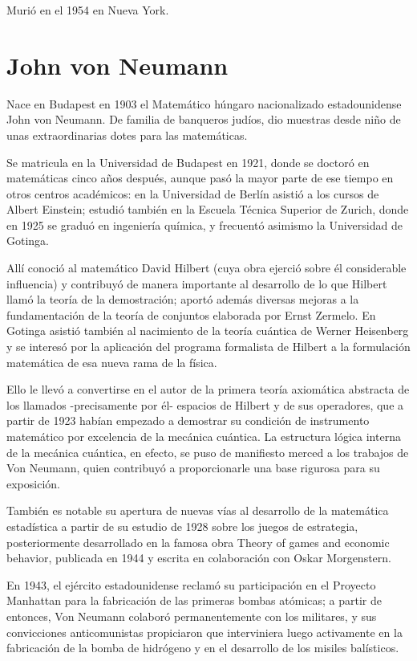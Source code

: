 \documentclass[letterpaper, 11pt]{article}
\begin{document}
\noindent Murió en el 1954 en Nueva York.

\newpage
\section*{John von Neumann}

Nace en Budapest en 1903 el Matemático húngaro nacionalizado estadounidense John von Neumann. De familia de banqueros judíos, dio muestras desde niño de unas extraordinarias dotes para las matemáticas.

\noindent Se matricula en la Universidad de Budapest en 1921, donde se doctoró en matemáticas cinco años después, aunque pasó la mayor parte de ese tiempo en otros centros académicos: en la Universidad de Berlín asistió a los cursos de Albert Einstein; estudió también en la Escuela Técnica Superior de Zurich, donde en 1925 se graduó en ingeniería química, y frecuentó asimismo la Universidad de Gotinga.

\noindent Allí conoció al matemático David Hilbert (cuya obra ejerció sobre él considerable influencia) y contribuyó de manera importante al desarrollo de lo que Hilbert llamó la teoría de la demostración; aportó además diversas mejoras a la fundamentación de la teoría de conjuntos elaborada por Ernst Zermelo. En Gotinga asistió también al nacimiento de la teoría cuántica de Werner Heisenberg y se interesó por la aplicación del programa formalista de Hilbert a la formulación matemática de esa nueva rama de la física.

\noindent Ello le llevó a convertirse en el autor de la primera teoría axiomática abstracta de los llamados -precisamente por él- espacios de Hilbert y de sus operadores, que a partir de 1923 habían empezado a demostrar su condición de instrumento matemático por excelencia de la mecánica cuántica. La estructura lógica interna de la mecánica cuántica, en efecto, se puso de manifiesto merced a los trabajos de Von Neumann, quien contribuyó a proporcionarle una base rigurosa para su exposición.

\noindent También es notable su apertura de nuevas vías al desarrollo de la matemática estadística a partir de su estudio de 1928 sobre los juegos de estrategia, posteriormente desarrollado en la famosa obra Theory of games and economic behavior, publicada en 1944 y escrita en colaboración con Oskar Morgenstern.

\noindent En 1943, el ejército estadounidense reclamó su participación en el Proyecto Manhattan para la fabricación de las primeras bombas atómicas; a partir de entonces, Von Neumann colaboró permanentemente con los militares, y sus convicciones anticomunistas propiciaron que interviniera luego activamente en la fabricación de la bomba de hidrógeno y en el desarrollo de los misiles balísticos.
\end{document}
